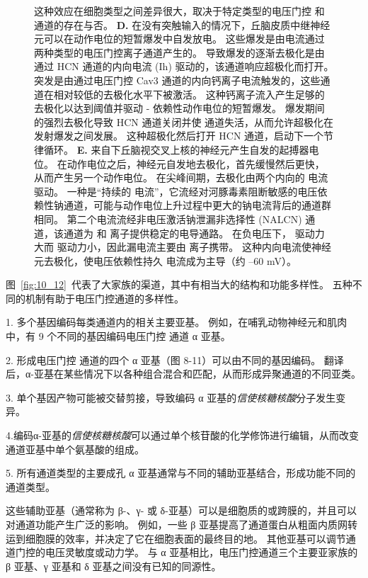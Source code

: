 \begin{figure}[htbp]
{		这种效应在细胞类型之间差异很大，取决于特定类型的电压门控  和  通道的存在与否。
		\textbf{D.} 在没有突触输入的情况下，丘脑皮质中继神经元可以在动作电位的短暂爆发中自发放电。
		这些爆发是由电流通过两种类型的电压门控离子通道产生的。
		导致爆发的逐渐去极化是由通过 HCN 通道的内向电流 (Ih) 驱动的，该通道响应超极化而打开。
		突发是由通过电压门控 Cav3 通道的内向钙离子电流触发的，这些通道在相对较低的去极化水平下被激活。
		这种钙离子流入产生足够的去极化以达到阈值并驱动 - 依赖性动作电位的短暂爆发。
		爆发期间的强烈去极化导致 HCN 通道关闭并使  通道失活，从而允许超极化在发射爆发之间发展。
		这种超极化然后打开 HCN 通道，启动下一个节律循环\cite{mccormick1992model}。 
		\textbf{E.} 来自下丘脑视交叉上核的神经元产生自发的起搏器电位。
		在动作电位之后，神经元自发地去极化，首先缓慢然后更快，从而产生另一个动作电位。
		在尖峰间期，去极化由两个内向的  电流驱动。
		一种是“持续的  电流”，它流经对河豚毒素阻断敏感的电压依赖性钠通道，可能与动作电位上升过程中更大的钠电流背后的通道群相同。
		第二个电流流经非电压激活钠泄漏非选择性 (NALCN) 通道，该通道为  和  离子提供稳定的电导通路。
		在负电压下， 驱动力大而  驱动力小，因此漏电流主要由  离子携带。
		这种内向电流使神经元去极化，使电压依赖性持久  电流成为主导（约 –60 mV）\cite{jackson2004mechanism}。}
	\label{fig:10_15}
\end{figure}


图~\ref{fig:10_12}~代表了大家族的渠道，其中有相当大的结构和功能多样性。
五种不同的机制有助于电压门控通道的多样性。


1. 多个基因编码每类通道内的相关主要亚基。
例如，在哺乳动物神经元和肌肉中，有 9 个不同的基因编码电压门控  通道 α 亚基。


2. 形成电压门控  通道的四个 α 亚基（图 8-11）可以由不同的基因编码。
翻译后，α-亚基在某些情况下以各种组合混合和匹配，从而形成异聚通道的不同亚类。 


3. 单个基因产物可能被交替剪接，导致编码 α 亚基的\textit{信使核糖核酸}分子发生变异。


4.编码α-亚基的\textit{信使核糖核酸}可以通过单个核苷酸的化学修饰进行编辑，从而改变通道亚基中单个氨基酸的组成。 


5. 所有通道类型的主要成孔 α 亚基通常与不同的辅助亚基结合，形成功能不同的通道类型。


这些辅助亚基（通常称为 β-、γ- 或 δ-亚基）可以是细胞质的或跨膜的，并且可以对通道功能产生广泛的影响。
例如，一些 β 亚基提高了通道蛋白从粗面内质网转运到细胞膜的效率，并决定了它在细胞表面的最终目的地。
其他亚基可以调节通道门控的电压灵敏度或动力学。
与 α 亚基相比，电压门控通道三个主要亚家族的 β 亚基、γ 亚基和 δ 亚基之间没有已知的同源性。


